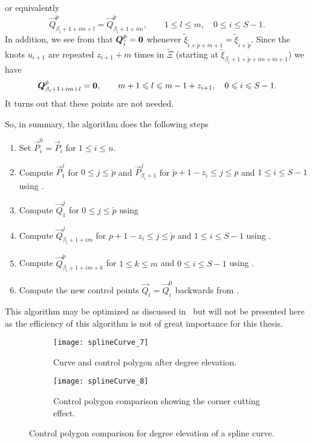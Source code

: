 or equivalently
\begin{equation}\label{Eq:coeffFormula5}
	\vec{Q}_{\beta_i+1+i m+l}^{\check{p}} = \vec{Q}_{\beta_i+1+i m}^{\check{p}},\qquad 1 \leq l \leq m,\quad 0\leq i \leq S-1. 
\end{equation}
In addition, we see from  that $\vec{Q}_{\tilde{i}}^{\check{p}}=\zerovec$ whenever $\tilde{\xi}_{\tilde{i}+\check{p}+m+1} = \tilde{\xi}_{\tilde{i}+\check{p}}$. Since the knots $u_{i+1}$ are repeated $z_{i+1}+m$ times in $\tilde{\Xi}$ (starting at $\tilde{\xi}_{\beta_i+1+\check{p}+im+m+1}$) we have
\begin{equation*}
	\vec{Q}_{\beta_i+1+i m+l}^{\check{p}}=\zerovec,\qquad m+1 \leq l \leq m - 1 + z_{i+1},\quad 0\leq i \leq S-1. 
\end{equation*}
It turns out that these points are not needed.

So, in summary, the algorithm does the following steps
\begin{enumerate}
	\item Set $\vec{P}_i^0 = \vec{P}_i$ for $1\leq i\leq n$. 
	\item Compute $\vec{P}_1^j$ for $0 \leq j \leq \check{p}$ and $\vec{P}_{\beta_i+1}^j$ for $\check{p}+1-z_i\leq j\leq p$ and $1\leq i\leq S-1$ using .
	\item Compute $\vec{Q}_1^j$ for $0 \leq j \leq \check{p}$ using  
	\item Compute $\vec{Q}_{\beta_i+1+im}^j$ for $p+1-z_i\leq j\leq \check{p}$ and $1\leq i\leq S-1$ using .
	\item Compute $\vec{Q}_{\beta_i+1+i m+k}^{\check{p}}$ for $1 \leq k \leq m$ and $0\leq i \leq S-1$ using . 
	\item Compute the new control points $\vec{Q}_i=\vec{Q}_i^0$ backwards from .
\end{enumerate}
This algorithm may be optimized as discussed in~\cite{Huang2004ede} but will not be presented here as the efficiency of this algorithm is not of great importance for this thesis.

\begin{figure}
        \centering        
        \begin{subfigure}{0.49\textwidth}
       		\centering
			\texttt{[image: splineCurve\_7]}
            \caption{Curve and control polygon after degree elevation.}
            \label{Fig:BsplineCurveDegreeElevated}
        \end{subfigure}%
        \hspace*{0.02\textwidth}%
        \begin{subfigure}{0.49\textwidth}
       		\centering
			\texttt{[image: splineCurve\_8]}
            \caption{Control polygon comparison showing the corner cutting effect.}
            \label{Fig:BsplineCurveDegreeElevated2}
        \end{subfigure}
        \caption{Control polygon comparison for degree elevation of a spline curve.}
\end{figure}

